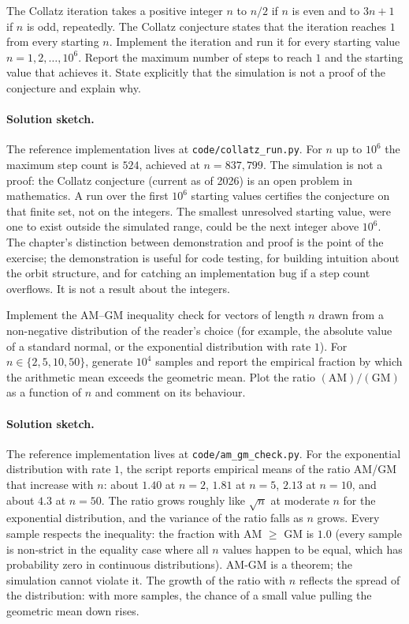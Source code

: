 \begin{exercise}
The Collatz iteration takes a positive integer $n$ to $n/2$ if $n$
is even and to $3n + 1$ if $n$ is odd, repeatedly. The Collatz
conjecture states that the iteration reaches $1$ from every starting
$n$. Implement the iteration and run it for every starting value
$n = 1, 2, \ldots, 10^{6}$. Report the maximum number of steps to
reach $1$ and the starting value that achieves it. State explicitly
that the simulation is not a proof of the conjecture and explain
why.

\paragraph{Solution sketch.}
The reference implementation lives at \texttt{code/collatz\_run.py}.
For $n$ up to $10^{6}$ the maximum step count is $524$, achieved at
$n = 837{,}799$. The simulation is not a proof: the Collatz
conjecture (current as of 2026) is an open problem in mathematics.
A run over the first $10^{6}$ starting values certifies the
conjecture on that finite set, not on the integers. The smallest
unresolved starting value, were one to exist outside the simulated
range, could be the next integer above $10^{6}$. The chapter's
distinction between demonstration and proof is the point of the
exercise; the demonstration is useful for code testing, for building
intuition about the orbit structure, and for catching an
implementation bug if a step count overflows. It is not a result
about the integers.
\end{exercise}

\begin{exercise}
Implement the AM--GM inequality check for vectors of length $n$
drawn from a non-negative distribution of the reader's choice (for
example, the absolute value of a standard normal, or the exponential
distribution with rate $1$). For $n \in \{2, 5, 10, 50\}$, generate
$10^{4}$ samples and report the empirical fraction by which the
arithmetic mean exceeds the geometric mean. Plot the ratio
$(\text{AM})/(\text{GM})$ as a function of $n$ and comment on its
behaviour.

\paragraph{Solution sketch.}
The reference implementation lives at \texttt{code/am\_gm\_check.py}.
For the exponential distribution with rate $1$, the script reports
empirical means of the ratio AM/GM that increase with $n$: about
$1.40$ at $n = 2$, $1.81$ at $n = 5$, $2.13$ at $n = 10$, and
about $4.3$ at $n = 50$. The ratio grows roughly like $\sqrt{n}$ at
moderate $n$ for the exponential distribution, and the variance of
the ratio falls as $n$ grows. Every sample respects the inequality:
the fraction with AM $\geq$ GM is $1.0$ (every sample is non-strict
in the equality case where all $n$ values happen to be equal, which
has probability zero in continuous distributions). AM-GM is a
theorem; the simulation cannot violate it. The growth of the ratio
with $n$ reflects the spread of the distribution: with more samples,
the chance of a small value pulling the geometric mean down rises.
\end{exercise}


